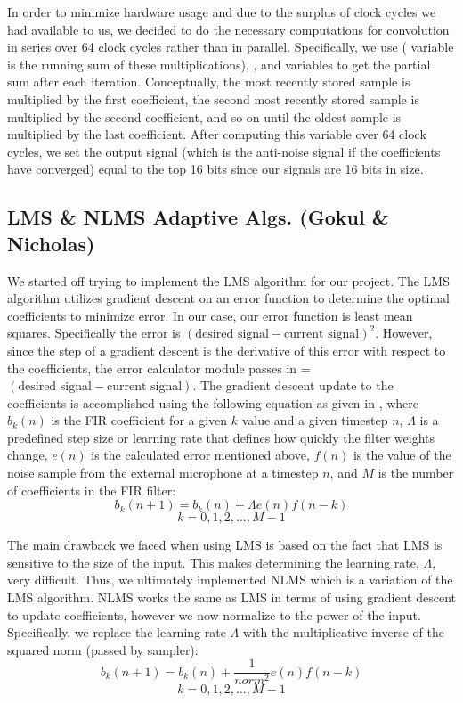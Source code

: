 \documentclass{fpgairpods}
\begin{document}
In order to minimize hardware usage and due to the surplus of clock cycles we had available to us, we decided to do the necessary computations for convolution in series over 64 clock cycles rather than in parallel. Specifically, we use  ( variable is the running sum of these multiplications), , and  variables to get the partial sum after each iteration. Conceptually, the most recently stored sample is multiplied by the first coefficient, the second most recently stored sample is multiplied by the second coefficient, and so on until the oldest sample is multiplied by the last coefficient. After computing this variable over 64 clock cycles, we set the output signal  (which is the anti-noise signal if the coefficients have converged) equal to the top 16 bits since our signals are 16 bits in size.


\subsection{LMS \& NLMS Adaptive Algs. (Gokul \& Nicholas)}
We started off trying to implement the LMS algorithm for our project. The LMS algorithm utilizes gradient descent on an error function to determine the optimal coefficients to minimize error. In our case, our error function is least mean squares. Specifically the error is $(\text{desired signal} - \text{current signal})^2$. However, since the step of a gradient descent is the derivative of this error with respect to the coefficients, the error calculator module passes in  = $(\text{desired signal} - \text{current signal})$. The gradient descent update to the coefficients is accomplished using the following equation as given in \cite{lmsfilter}, where $b_k(n)$ is the FIR coefficient for a given $k$ value and a given timestep $n$, $\Lambda$ is a predefined step size or learning rate that defines how quickly the filter weights change, $e(n)$ is the calculated error mentioned above, $f(n)$ is the value of the noise sample from the external microphone at a timestep $n$, and $M$ is the number of coefficients in the FIR filter:
\[ b_k(n + 1) = b_k(n) + \Lambda e(n)f(n-k) \]
\[ k = 0, 1, 2,\ldots,  M-1 \]

The main drawback we faced when using LMS is based on the fact that LMS is sensitive to the size of the input. This makes determining the learning rate, $\Lambda$, very difficult. Thus, we ultimately implemented NLMS which is a variation of the LMS algorithm. NLMS works the same as LMS in terms of using gradient descent to update coefficients, however we now normalize to the power of the input. Specifically, we replace the learning rate $\Lambda$ with the multiplicative inverse of the squared norm (passed by sampler):
\[ b_k(n + 1) = b_k(n) + \frac{1}{norm^2} e(n)f(n-k) \]
\[ k = 0, 1, 2,\ldots,  M-1 \]
\end{document}
